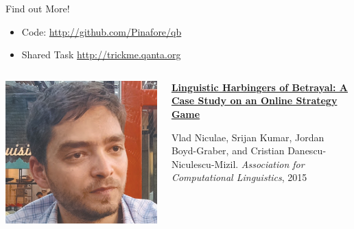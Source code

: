 \documentclass[xcolor=dvipsnames]{beamer}
\begin{document}
\begin{frame}{Find out More!}

		\begin{itemize}
			\item Code: \url{http://github.com/Pinafore/qb}
                        \item Shared Task \url{http://trickme.qanta.org}
		\end{itemize}

    \end{frame}

\begin{frame}{}

  \begin{columns}
        \includegraphics[width=0.7\linewidth]{general_figures/vlad}
        \begin{block}{{\bf
              \href{http://cs.colorado.edu/~jbg//docs/2015_acl_diplomacy.pdf}{Linguistic Harbingers of Betrayal: A Case Study on an Online Strategy Game}}}

          Vlad Niculae, Srijan Kumar, Jordan Boyd-Graber, and Cristian
          Danescu-Niculescu-Mizil. \emph{Association for Computational Linguistics}, 2015
        \end{block}

  \end{columns}
\end{frame}
\end{document}
